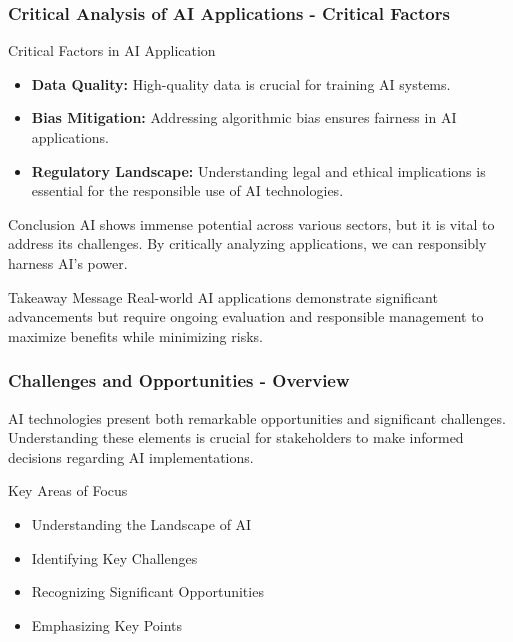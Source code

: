 \documentclass{beamer}
\begin{document}
\begin{frame}[fragile]
    \frametitle{Critical Analysis of AI Applications - Critical Factors}
    \begin{block}{Critical Factors in AI Application}
        \begin{itemize}
            \item \textbf{Data Quality:} High-quality data is crucial for training AI systems.
            \item \textbf{Bias Mitigation:} Addressing algorithmic bias ensures fairness in AI applications.
            \item \textbf{Regulatory Landscape:} Understanding legal and ethical implications is essential for the responsible use of AI technologies.
        \end{itemize}
    \end{block}

    \begin{block}{Conclusion}
        AI shows immense potential across various sectors, but it is vital to address its challenges. By critically analyzing applications, we can responsibly harness AI's power.
    \end{block}
    
    \begin{block}{Takeaway Message}
        Real-world AI applications demonstrate significant advancements but require ongoing evaluation and responsible management to maximize benefits while minimizing risks.
    \end{block}
\end{frame}

\begin{frame}[fragile]
    \frametitle{Challenges and Opportunities - Overview}
    AI technologies present both remarkable opportunities and significant challenges. 
    Understanding these elements is crucial for stakeholders to make informed decisions regarding AI implementations.

    \begin{block}{Key Areas of Focus}
        \begin{itemize}
            \item Understanding the Landscape of AI
            \item Identifying Key Challenges
            \item Recognizing Significant Opportunities
            \item Emphasizing Key Points
        \end{itemize}
    \end{block}
\end{frame}
\end{document}
